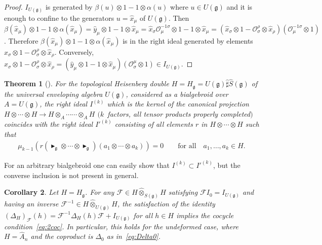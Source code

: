 \documentclass[pdftex]{sigma}
\def\gg{\mathfrak{g}}
\def\hx{\hat{x}}
\def\hy{\hat{y}}
\newtheorem{Theorem}{Theorem}[section]
\newtheorem{Corollary}[Theorem]{Corollary}
\numberwithin{equation}{section}
\begin{document}
\begin{proof}$I_{U(\gg)}$ is generated by $\beta(u)\otimes 1 - 1\otimes\alpha(u)$ where $u\in U(\gg)$ and it is enough to confine to the generators $u=\hx_\mu$ of $U(\gg)$. Then $\beta(\hx_\mu)\otimes 1 - 1\otimes \alpha(\hx_\mu) = \hy_\mu\otimes 1 - 1\otimes\hx_\mu
= \hx_\sigma \mathcal{O}^{-1\sigma}_\mu\otimes 1- 1\otimes\hx_\mu
= (\hx_\sigma\otimes 1 - \mathcal{O}^\rho_\sigma\otimes\hx_\rho)(\mathcal{O}^{-1\sigma}_\mu\otimes 1)$. Therefore $\beta(\hx_\mu)\otimes 1 - 1\otimes \alpha(\hx_\mu)$ is in the right ideal generated by elements $\hx_\sigma\otimes 1 - \mathcal{O}^\rho_\sigma\otimes\hx_\rho$. Conversely, $\hx_\sigma\otimes 1 - \mathcal{O}^\rho_\sigma\otimes\hx_\rho = (\hy_\mu\otimes 1 - 1\otimes\hx_\mu)(\mathcal{O}^\mu_\sigma\otimes 1)
\in I_{U(\gg)}$.
\end{proof}

\begin{Theorem}[{\cite[Theorem~4]{halg}}]\label{th:th4halg}
For the topological Heisenberg double $H = H_\gg = U(\gg)\hat\sharp\hat{S}(\gg)$ of the universal enveloping algebra $U(\gg)$, considered as a bialgebroid over $A = U(\gg)$, the right ideal $I^{(k)}$ which is the kernel of the canonical projection $H\otimes\cdots\otimes H\to H\otimes_A\cdots \cdots\otimes_A H$ $(k$~factors, all tensor products properly completed$)$ coincides with the right ideal $I'^{(k)}$ consisting of all elements $r$ in $H\otimes\cdots\otimes H$ such that
\begin{gather*}
\mu_{k-1} \left( r (\blacktriangleright_\gg\otimes\cdots\otimes\blacktriangleright_\gg)(a_1\otimes\cdots \otimes a_k)\right)= 0\qquad
\text{for all}\quad a_1,\dots,a_k\in H.
\end{gather*}
\end{Theorem}
For an arbitrary bialgebroid one can easily show that $I^{(k)}\subset I'^{(k)}$, but the converse inclusion is not present in general. \begin{Corollary}\label{cor:FDFimpliesDt}
Let $H = H_\gg$. For any $\mathcal{F}\in H\hat\otimes_{S(\gg)} H$ satisfying $\mathcal{F} I_0 = I_{U(\gg)}$ and having an inverse $\mathcal{F}^{-1}\in H\hat\otimes_{U(\gg)} H$, the satisfaction of the identity $(\Delta_H)_{\mathcal{F}}(h) = \mathcal{F}^{-1}\Delta_H(h)\mathcal{F} + I_{U(\gg)}$ for all $h\in H$ implies the cocycle condition~\eqref{eq:2coc}. In particular, this holds for the undeformed case, where $H = \hat{A}_n$ and the coproduct is $\Delta_0$ as in~\eqref{eq:Delta0}.
\end{Corollary}
\end{document}
